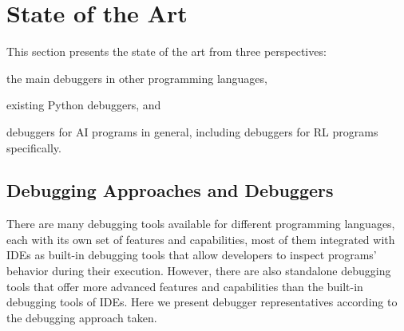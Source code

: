 
\section{State of the Art}
\label{sec:state_of_the_art}

This section presents the state of the art from three perspectives: 
\begin{enumerate*}[label=(\arabic*)]
\item the main debuggers in other 
programming languages, 
\item existing Python debuggers, and 
\item debuggers for \ac{AI} programs in general, including debuggers for \ac{RL} programs specifically.
\end{enumerate*}


\subsection{Debugging Approaches and Debuggers}
\label{sec:other}

There are many debugging tools available for different programming 
languages, each with its own set of features and capabilities, most of them integrated with IDEs as
built-in debugging tools that allow developers to inspect programs' behavior during their execution. 
However, there are also standalone debugging tools that offer more advanced features and capabilities 
than the built-in debugging tools of IDEs. Here we present debugger representatives according to the 
debugging approach taken.

